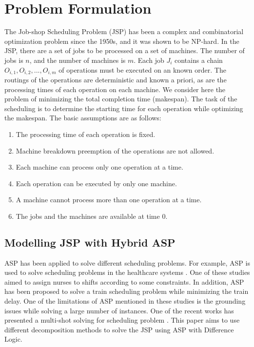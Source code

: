 \documentclass{tlp} %
\begin{document}
\section{Problem Formulation}
The Job-shop Scheduling Problem (JSP) has been a complex and combinatorial optimization problem since the 1950s, and it was shown to be NP-hard. In the JSP, there are a set of jobs to be processed on a set of machines. The number of jobs is $n$, and the number of machines is $m$. Each job $J_i$ contains a chain $ O_{i,1}, O_{i,2},...,O_{i,m} $ of operations must be executed on an known order. The routings of the operations are deterministic and known a priori, as are the processing times of each operation on each machine. We consider here the problem of minimizing the total completion time (makespan). The task of the scheduling is to determine the starting time for each operation while optimizing the makespan. The basic assumptions are as follows:

\begin{enumerate}
	\item The processing time of each operation is fixed.
	\item Machine breakdown preemption of the operations are not allowed.
	\item Each machine can process only one operation at a time.
	\item Each operation can be executed by only one machine.
	\item A machine cannot process more than one operation at a time.
	\item The jobs and the machines are available at time $0$.
\end{enumerate}

\subsection{Modelling JSP with Hybrid ASP}
ASP has been applied to solve different scheduling problems. For example, ASP is used to solve scheduling problems in the healthcare systems \cite{dodaro2017nurse,dodaro2019asp}. One of these studies aimed to assign nurses to shifts according to some constraints\cite{dodaro2017nurse}. In addition, ASP has been proposed to solve a train scheduling problem while minimizing the train delay\cite{abels2019train}. One of the limitations of ASP mentioned in these studies is the grounding issues while solving a large number of instances. One of the recent works has presented a multi-shot solving for scheduling problem \cite{francescutto2021solving}. This paper aims to use different decomposition methods to solve the JSP using ASP with Difference Logic. 
\end{document}

